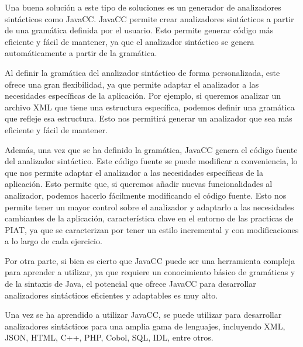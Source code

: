 Una buena solución a este tipo de soluciones es un generador de analizadores sintácticos como JavaCC. JavaCC permite crear analizadores sintácticos a partir de una gramática definida por el usuario. Esto permite generar código más eficiente y fácil de mantener, ya que el analizador sintáctico se genera automáticamente a partir de la gramática.

Al definir la gramática del analizador sintáctico de forma personalizada, este ofrece una gran flexibilidad, ya que permite adaptar el analizador a las necesidades específicas de la aplicación. Por ejemplo, si queremos analizar un archivo XML que tiene una estructura específica, podemos definir una gramática que refleje esa estructura. Esto nos permitirá generar un analizador que sea más eficiente y fácil de mantener.

Además, una vez que se ha definido la gramática, JavaCC genera el código fuente del analizador sintáctico. Este código fuente se puede modificar a conveniencia, lo que nos permite adaptar el analizador a las necesidades específicas de la aplicación. Esto permite que, si queremos añadir nuevas funcionalidades al analizador, podemos hacerlo fácilmente modificando el código fuente. Esto nos permite tener un mayor control sobre el analizador y adaptarlo a las necesidades cambiantes de la aplicación, característica clave en el entorno de las practicas de PIAT, ya que se caracterizan por tener un estilo incremental y con modificaciones a lo largo de cada ejercicio.

Por otra parte, si bien es cierto que JavaCC puede ser una herramienta compleja para aprender a utilizar, ya que requiere un conocimiento básico de gramáticas y de la sintaxis de Java, el potencial que ofrece JavaCC para desarrollar analizadores sintácticos eficientes y adaptables es muy alto.

Una vez se ha aprendido a utilizar JavaCC, se puede utilizar para desarrollar analizadores sintácticos para una amplia gama de lenguajes, incluyendo XML, JSON, HTML, C++, PHP, Cobol, SQL, IDL, entre otros\cite{javaccgithub}.